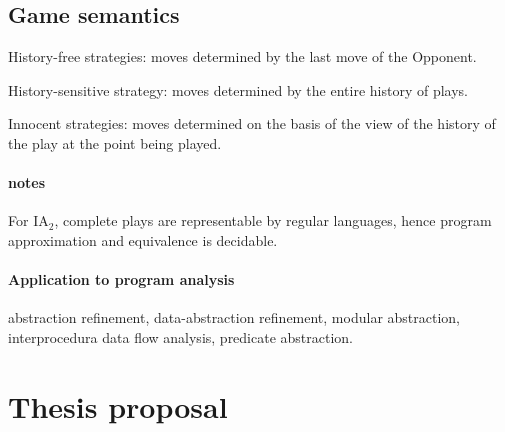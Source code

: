 \documentclass[nocenter]{thesis}
\begin{document}
\chapter{Game semantics}

History-free strategies: moves determined by the last move of the
Opponent.

History-sensitive strategy: moves determined by the entire history
of plays.

Innocent strategies: moves determined on the basis of the view of
the history of the play at the point being played.


\subsection{notes} For IA$_2$, complete plays are representable by
regular languages, hence program approximation and equivalence is
decidable.

\subsection{Application to program analysis}
abstraction refinement, data-abstraction refinement, modular
abstraction, interprocedura data flow analysis, predicate
abstraction.

\part{Thesis proposal}

\chapter{}
\end{document}
